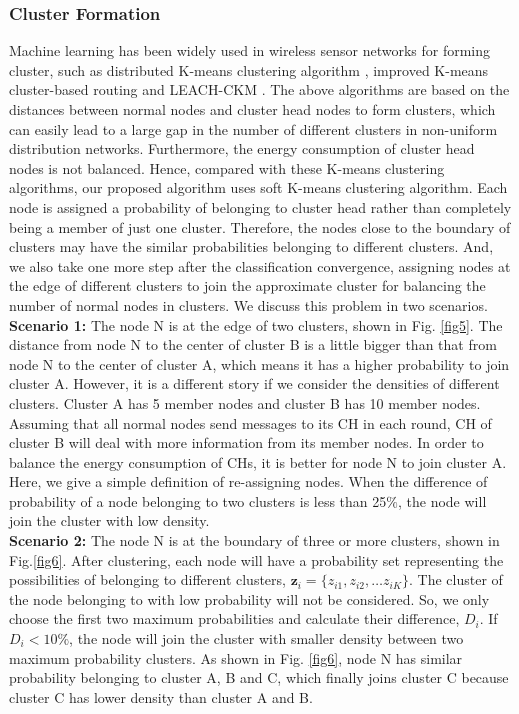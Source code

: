 \documentclass[11pt]{report}
\begin{document}
	
	\subsubsection{Cluster Formation}
	 
	 Machine learning has been widely used in wireless sensor networks for forming cluster, such as distributed K-means clustering algorithm \cite{7425183}, improved K-means cluster-based routing\cite{8379004} and LEACH-CKM \cite{6987570}. The above algorithms are based on the distances between normal nodes and cluster head nodes to form clusters, which can easily lead to a large gap in the number of different clusters in non-uniform distribution networks. Furthermore, the energy consumption of cluster head nodes is not balanced. Hence, compared with these K-means clustering algorithms, our proposed algorithm uses soft K-means clustering algorithm. Each node is assigned a probability of belonging to cluster head rather than completely being a member of just one cluster. Therefore, the nodes close to the boundary of clusters may have the similar probabilities belonging to different clusters. And, we also take one more step after the classification convergence, assigning nodes at the edge of different clusters to join the approximate cluster for balancing the number of normal nodes in clusters. We discuss this problem in two scenarios.\\
	 
	 \noindent \textbf{Scenario 1:} The node N is at the edge of two clusters, shown in Fig. \ref{fig5}. The distance from node N to the center of cluster B is a little bigger than that from node N to the center of cluster A, which means it has a higher probability to join cluster A. However, it is a different story if we consider the densities of different clusters. Cluster A has 5 member nodes and cluster B has 10 member nodes. Assuming that all normal nodes send messages to its CH in each round, CH of cluster B will deal with more information from its member nodes. In order to balance the energy consumption of CHs, it is better for node N to join cluster A. Here, we give a simple definition of re-assigning nodes. When the difference of probability of a node belonging to two clusters is less than 25$\%$, the node will join the cluster with low density.\\
	 \noindent \textbf{Scenario 2:} The node N is at the boundary of three or more clusters, shown in Fig.\ref{fig6}. After clustering, each node will have a probability set representing the possibilities of belonging to different clusters, $\bm{z}_i = \{z_{i1},z_{i2}, \dots z_{iK} \}$. The cluster of the node belonging to with low probability will not be considered. So, we only choose the first two maximum probabilities and calculate their difference, $D_i$. If $ D_{i} < 10\%$, the node will join the cluster with smaller density between two maximum probability clusters. As shown in Fig. \ref{fig6}, node N has similar probability belonging to cluster A, B and C, which finally joins cluster C because cluster C has lower density than cluster A and B.  
	 
\end{document}
